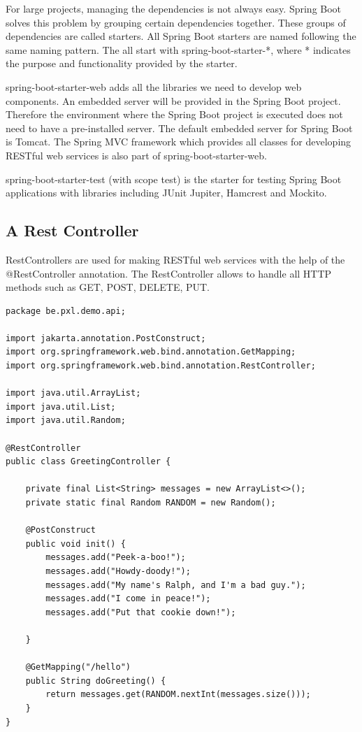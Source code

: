 \documentclass[a4paper, 12pt]{report}
\begin{document}
For large projects, managing the dependencies is not always easy. Spring Boot solves this problem by grouping certain dependencies together. These groups of dependencies are called starters. All Spring Boot starters are named following the same naming pattern. The all start with spring-boot-starter-*, where * indicates the purpose and functionality provided by the starter.

spring-boot-starter-web adds all the libraries we need to develop web components. An embedded server will be provided in the Spring Boot project. Therefore the environment where the Spring Boot project is executed does not need to have a pre-installed server. The default embedded server for Spring Boot is Tomcat. The Spring MVC framework which provides all classes for developing RESTful web services is also part of spring-boot-starter-web.

spring-boot-starter-test (with scope test) is the starter for testing Spring Boot applications with libraries including JUnit Jupiter, Hamcrest and Mockito.

\subsection{A Rest Controller}

RestControllers are used for making RESTful web services with the help of the @RestController annotation. The RestController allows to handle all HTTP methods such as GET, POST, DELETE, PUT. 

\begin{lstlisting}[frame=single]
package be.pxl.demo.api;

import jakarta.annotation.PostConstruct;
import org.springframework.web.bind.annotation.GetMapping;
import org.springframework.web.bind.annotation.RestController;

import java.util.ArrayList;
import java.util.List;
import java.util.Random;

@RestController
public class GreetingController {

    private final List<String> messages = new ArrayList<>();
    private static final Random RANDOM = new Random();

    @PostConstruct
    public void init() {
        messages.add("Peek-a-boo!");
        messages.add("Howdy-doody!");
        messages.add("My name's Ralph, and I'm a bad guy.");
        messages.add("I come in peace!");
        messages.add("Put that cookie down!");

    }

    @GetMapping("/hello")
    public String doGreeting() {
        return messages.get(RANDOM.nextInt(messages.size()));
    }
}
\end{lstlisting}
\end{document}
